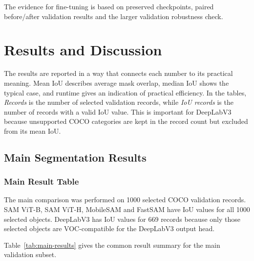 \documentclass[9pt,a4paper,oneside]{rho-class/rho}
\begin{document}
    The evidence for fine-tuning is based on preserved checkpoints, paired before/after validation results and the larger validation robustness check.

\section{Results and Discussion}

    The results are reported in a way that connects each number to its practical meaning. Mean IoU describes average mask overlap, median IoU shows the typical case, and runtime gives an indication of practical efficiency. In the tables, \textit{Records} is the number of selected validation records, while \textit{IoU records} is the number of records with a valid IoU value. This is important for DeepLabV3 because unsupported COCO categories are kept in the record count but excluded from its mean IoU.

\subsection{Main Segmentation Results}

\subsubsection{Main Result Table}

    The main comparison was performed on 1000 selected COCO validation records. SAM ViT-B, SAM ViT-H, MobileSAM and FastSAM have IoU values for all 1000 selected objects. DeepLabV3 has IoU values for 669 records because only those selected objects are VOC-compatible for the DeepLabV3 output head.

    Table~\ref{tab:main-results} gives the common result summary for the main validation subset.

\begin{table}[H]
    \centering
    \caption{Main validation results.}
    \label{tab:main-results}
\end{table}
\end{document}
